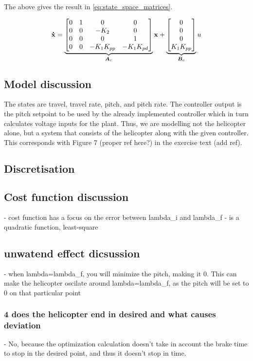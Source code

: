 The above gives the result in \eqref{eq:state_space_matrices}.

\begin{equation}\label{eq:state_space_matrices}
	\mathbf{\dot{x}} =
	\underbrace{
		\begin{bmatrix}
			0 & 1 & 0 				& 0 \\
			0 & 0 & -K_{2} 			& 0 \\
			0 & 0 & 0 				& 1 \\
			0 & 0 & -K_{1}K_{pp}	& -K_{1}K_{pd}
		\end{bmatrix}
	}_{\bm{A}_{c}}
	\mathbf{x} +
	\underbrace{
		\begin{bmatrix}
			0 \\ 0 \\ 0 \\ K_{1}K_{pp}
		\end{bmatrix}
	}_{\bm{B}_{c}}
	u
\end{equation}



\subsection{Model discussion}
The states are travel, travel rate, pitch, and pitch rate. The controller output is the pitch setpoint to be used by the already implemented controller which in turn calculates voltage inputs for the plant. Thus, we are modelling not the helicopter alone, but a system that consists of the helicopter along with the given controller. This corresponds with Figure 7 (proper ref here?) in the exercise text (add ref).



\subsection{Discretisation}

\subsection{Cost function discussion}
- cost function has a focus on the error between lambda_i and lambda_f
- is a quadratic function, least-square 

\subsection{unwatend effect dicsussion}
- when lambda=lambda_f, you will minimize the pitch, making it 0. This can make the helicopter oscilate around lambda=lambda_f, as the pitch will be set to 0 on that particular point

\subsubsection{4 does the helicopter end in desired and what causes deviation}
- No, because the optimization calculation doesn't take in account the brake time to stop in the desired point, and thus it doesn't stop in time. 

